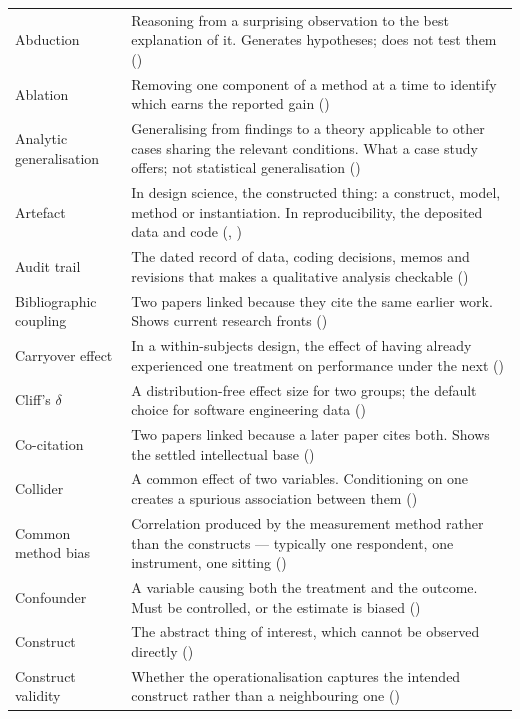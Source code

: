 \begin{center}
\begin{longtable}{@{}L{3.6cm}L{10.5cm}@{}}
Abduction & Reasoning from a surprising observation to the best explanation of
  it. Generates hypotheses; does not test them () \\
Ablation & Removing one component of a method at a time to identify which earns
  the reported gain () \\
Analytic generalisation & Generalising from findings to a theory applicable to
  other cases sharing the relevant conditions. What a case study offers; not
  statistical generalisation () \\
Artefact & In design science, the constructed thing: a construct, model, method
  or instantiation. In reproducibility, the deposited data and code
  (, ) \\
Audit trail & The dated record of data, coding decisions, memos and revisions
  that makes a qualitative analysis checkable () \\
Bibliographic coupling & Two papers linked because they cite the same earlier
  work. Shows current research fronts () \\
Carryover effect & In a within-subjects design, the effect of having already
  experienced one treatment on performance under the next
  () \\
Cliff's $\delta$ & A distribution-free effect size for two groups; the default
  choice for software engineering data () \\
Co-citation & Two papers linked because a later paper cites both. Shows the
  settled intellectual base () \\
Collider & A common effect of two variables. Conditioning on one creates a
  spurious association between them () \\
Common method bias & Correlation produced by the measurement method rather than
  the constructs --- typically one respondent, one instrument, one sitting
  () \\
Confounder & A variable causing both the treatment and the outcome. Must be
  controlled, or the estimate is biased () \\
Construct & The abstract thing of interest, which cannot be observed directly
  () \\
Construct validity & Whether the operationalisation captures the intended
  construct rather than a neighbouring one () \\

\end{longtable}
\end{center}
